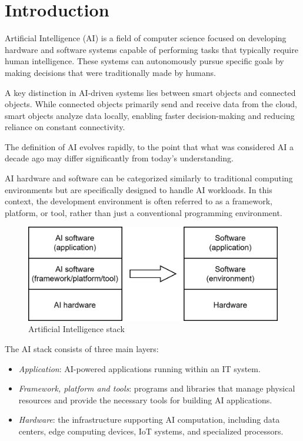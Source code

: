 \section{Introduction}

Artificial Intelligence (AI) is a field of computer science focused on developing hardware and software systems capable of performing tasks that typically require human intelligence. 
These systems can autonomously pursue specific goals by making decisions that were traditionally made by humans.

A key distinction in AI-driven systems lies between smart objects and connected objects.
While connected objects primarily send and receive data from the cloud, smart objects analyze data locally, enabling faster decision-making and reducing reliance on constant connectivity.

The definition of AI evolves rapidly, to the point that what was considered AI a decade ago may differ significantly from today's understanding.

AI hardware and software can be categorized similarly to traditional computing environments but are specifically designed to handle AI workloads. 
In this context, the development environment is often referred to as a framework, platform, or tool, rather than just a conventional programming environment.
\begin{figure}[H]
    \centering
    \includegraphics[width=0.5\linewidth]{images/eeai1.png}
    \caption{Artificial Intelligence stack}
\end{figure}
The AI stack consists of three main layers:
\begin{itemize}
    \item \textit{Application}: AI-powered applications running within an IT system.
    \item \textit{Framework, platform and tools}: programs and libraries that manage physical resources and provide the necessary tools for building AI applications.
    \item \textit{Hardware}: the infrastructure supporting AI computation, including data centers, edge computing devices, IoT systems, and specialized processors.
\end{itemize}